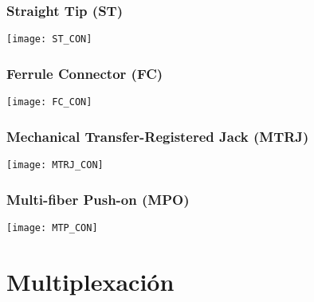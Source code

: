 \subsubsection*{Straight Tip (ST)}
\begin{center}
\texttt{[image: ST\_CON]}
\end{center}
\subsubsection*{Ferrule Connector (FC)}
\begin{center}
\texttt{[image: FC\_CON]}
\end{center}
\subsubsection*{Mechanical Transfer-Registered Jack (MTRJ)}
\begin{center}
\texttt{[image: MTRJ\_CON]}
\end{center}
\subsubsection*{Multi-fiber Push-on (MPO)}
\begin{center}
\texttt{[image: MTP\_CON]}
\end{center}
\section{Multiplexación}


